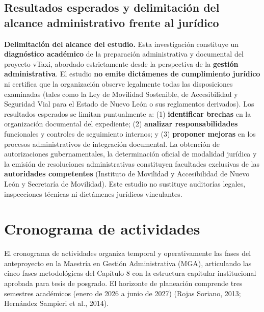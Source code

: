 {\subsection{Resultados esperados y delimitación del alcance administrativo frente al jurídico}
\textbf{Delimitación del alcance del estudio.} Esta investigación constituye un \textbf{diagnóstico académico} de la preparación administrativa y documental del proyecto vTaxi, abordado estrictamente desde la perspectiva de la \textbf{gestión administrativa}. El estudio \textbf{no emite dictámenes de cumplimiento jurídico} ni certifica que la organización observe legalmente todas las disposiciones examinadas (tales como la Ley de Movilidad Sostenible, de Accesibilidad y Seguridad Vial para el Estado de Nuevo León o sus reglamentos derivados). Los resultados esperados se limitan puntualmente a: (1) \textbf{identificar brechas} en la organización documental del expediente; (2) \textbf{analizar responsabilidades} funcionales y controles de seguimiento internos; y (3) \textbf{proponer mejoras} en los procesos administrativos de integración documental. La obtención de autorizaciones gubernamentales, la determinación oficial de modalidad jurídica y la emisión de resoluciones administrativas constituyen facultades exclusivas de las \textbf{autoridades competentes} (Instituto de Movilidad y Accesibilidad de Nuevo León y Secretaría de Movilidad). Este estudio no sustituye auditorías legales, inspecciones técnicas ni dictámenes jurídicos vinculantes.

\section{Cronograma de actividades}
El cronograma de actividades organiza temporal y operativamente las fases del anteproyecto en la Maestría en Gestión Administrativa (MGA), articulando las cinco fases metodológicas del Capítulo 8 con la estructura capitular institucional aprobada para tesis de posgrado. El horizonte de planeación comprende tres semestres académicos (enero de 2026 a junio de 2027) (Rojas Soriano, 2013; Hernández Sampieri et al., 2014).

}
